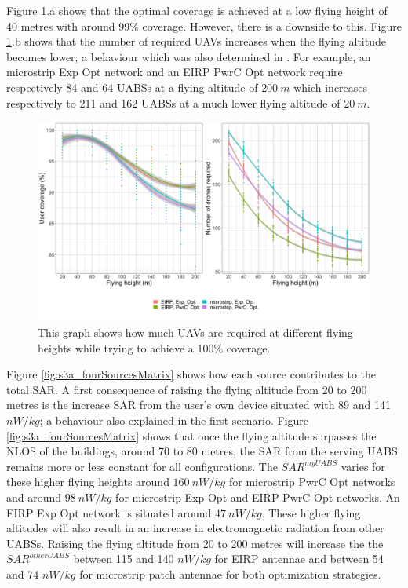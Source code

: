 \documentclass[twocolumn]{phdsymp} %
\begin{document}
Figure \ref{fig:s3a_numdronesAndCov}.a shows that the optimal coverage is achieved at a low flying height of 
40 metres with around 99\% coverage. 
However, there is a downside to this. 
Figure \ref{fig:s3a_numdronesAndCov}.b 
 shows that the number of required \gls{UAV}s increases when the flying altitude becomes lower;
a behaviour which was also determined in \cite{J2}.
For example, an microstrip \gls{Exp Opt} network and an \gls{EIRP} \gls{PwrC Opt} network require respectively 84 and 64
\gls{UABS}s at a flying altitude of $200\ m$ which increases respectively to 211 and 162 \gls{UABS}s at a much lower flying altitude of $20\ m$.

\begin{figure}[]
  \includegraphics[width=\linewidth]{../results/s3/fhvsnumdronesAndCov.png}
  \caption{This graph shows how much \acs{UAV}s are required at different flying heights while trying to achieve a 100\% coverage.}
  \label{fig:s3a_numdronesAndCov}
\end{figure}

Figure \ref{fig:s3a_fourSourcesMatrix} shows how each source contributes to the total \gls{SAR}.
A first consequence of raising the flying altitude from 
 20 to 200 metres is the increase \gls{SAR} from the user's own device situated
 with 89 and 141 $nW/kg$; a behaviour also explained in the first scenario.
Figure \ref{fig:s3a_fourSourcesMatrix} shows that once the flying altitude surpasses the \gls{NLOS} of the buildings, 
around 70 to 80 metres, the SAR from the serving \gls{UABS} remains 
more or less constant for all configurations.
The $SAR^{myUABS}$ varies for these higher flying heights 
around $160\ nW/kg$ for microstrip \gls{PwrC Opt} networks and around $98\ nW/kg$ for microstrip \gls{Exp Opt} and \gls{EIRP} \gls{PwrC Opt} networks.
An \gls{EIRP} \gls{Exp Opt} network is situated around $47\ nW/kg$.
These higher flying altitudes will also result in an increase in electromagnetic radiation from 
other \gls{UABS}s.
Raising the flying altitude from 20 to 200 metres will increase the
the $SAR^{otherUABS}$ between 115 and 140 $nW/kg$ for \gls{EIRP} antennae and between 54 and 74 $nW/kg$ for microstrip patch antennae
for both optimization strategies.
\end{document}
